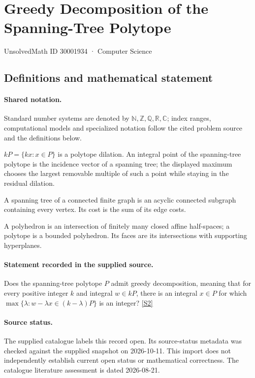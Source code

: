 \documentclass[11pt]{article}
\newcommand{\sref}[2]{\hyperlink{source:#1:#2}{[S#2]}}
\begin{document}
\setcounter{section}{30001933}
\section{Greedy Decomposition of the Spanning-Tree Polytope}\label{30001934}
{\small\sffamily UnsolvedMath ID 30001934 · Computer Science}
\subsection{Definitions and mathematical statement}

\paragraph{Shared notation.}Standard number systems are denoted by $\mathbb N,\mathbb Z,\mathbb Q,\mathbb R,\mathbb C$; index ranges, computational models and specialized notation follow the cited problem source and the definitions below.


$kP=\{kx:x\in P\}$ is a polytope dilation. An integral point of the spanning-tree polytope is the incidence vector of a spanning tree; the displayed maximum chooses the largest removable multiple of such a point while staying in the residual dilation.

A spanning tree of a connected finite graph is an acyclic connected subgraph containing every vertex. Its cost is the sum of its edge costs.

A polyhedron is an intersection of finitely many closed affine half-spaces; a polytope is a bounded polyhedron. Its faces are its intersections with supporting hyperplanes.
\paragraph{Statement recorded in the supplied source.}
Does the spanning-tree polytope $P$ admit greedy decomposition, meaning that for every positive integer $k$ and integral $w\in kP$, there is an integral $x\in P$ for which $\max\{\lambda:w-\lambda x\in(k-\lambda)P\}$ is an integer? \sref{30001934}{2}
\paragraph{Source status.}
The supplied catalogue labels this record open. Its source-status metadata was checked against the supplied snapshot on 2026-10-11. This import does not independently establish current open status or mathematical correctness. The catalogue literature assessment is dated 2026-08-21.
\end{document}
